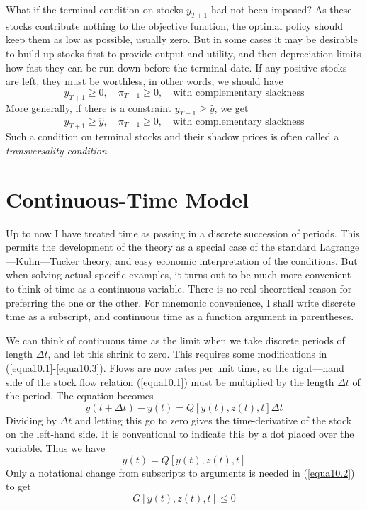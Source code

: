 What if the terminal condition on stocks $y_{T+1}$ had not been imposed? As these stocks contribute nothing to the objective function, the optimal policy should keep them as low as possible, usually zero. But in some cases it may be desirable to build up stocks first to provide output and utility, and then depreciation limits how fast they can be run down before the terminal date. If any positive stocks are left, they must be worthless, in other words, we should have
\begin{equation*}
y_{T+1} \geq 0, \quad \pi_{T+1} \geq 0, \quad \mbox{with complementary slackness}
\end{equation*}
More generally, if there is a constraint $y_{T+1} \geq \hat{y}$, we get
\begin{equation} \label{equa10.14}
y_{T+1} \geq \hat{y}, \quad \pi_{T+1} \geq 0, \quad \mbox{with complementary slackness}
\end{equation}
Such a condition on terminal stocks and their shadow prices is often called a \textit{transversality condition}.

\section*{Continuous-Time Model}

Up to now I have treated time as passing in a discrete succession of periods. This permits the development of the theory as a special case of the standard Lagrange—Kuhn—Tucker theory, and easy economic interpretation of the conditions. But when solving actual specific examples, it turns out to be much more convenient to think of time as a continuous variable. There is no real theoretical reason for preferring the one or the other. For mnemonic convenience, I shall write discrete time as a subscript, and continuous time as a function argument in parentheses.

We can think of continuous time as the limit when we take discrete periods of length $\Delta t$, and let this shrink to zero. This requires some modifications in (\ref{equa10.1}-\ref{equa10.3}). Flows are now rates per unit time, so the right—hand side of the stock flow relation (\ref{equa10.1}) must be multiplied by the length $\Delta t$ of the period. The equation becomes
\begin{equation*}
y(t + \Delta t) - y(t) = Q[y(t),z(t),t] \Delta t
\end{equation*}
Dividing by $\Delta t$ and letting this go to zero gives the time-derivative of the stock on the left-hand side. It is conventional to indicate this by a dot placed over the variable. Thus we have
\begin{equation} \label{equa10.15}
\dot{y}(t) = Q[y(t), z(t), t]
\end{equation}
Only a notational change from subscripts to arguments is needed in (\ref{equa10.2}) to get
\begin{equation} \label{equa10.16}
 G[y(t), z(t), t ] \leq 0
\end{equation}

